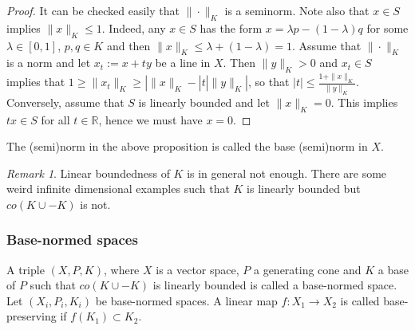 \documentclass[12pt]{article}
\theoremstyle{remark}
\newtheorem{rem}{Remark}
\newcommand{\<}{\langle}
\begin{document}
\begin{proof}
It can be checked easily that $\|\cdot\|_K$ is a seminorm. Note also that $x\in S$ implies $\|x\|_K\le 1$. Indeed, any $x\in S$ has the form $x=\lambda p-(1-\lambda)q$ for some  $\lambda\in [0,1]$, $p,q\in K$ and then  $\|x\|_K\le \lambda+(1-\lambda)=1$.  
Assume that $\|\cdot\|_K$ is a norm and let $x_t:=x+ty$ be a line in $X$. Then $\|y\|_K>0$ and $x_t\in  S$ implies that $1\ge \|x_t\|_K\ge |\|x\|_K-|t|\|y\|_K|$, so that $|t|\le \tfrac{1+\|x\|_K}{\|y\|_K}$. Conversely, assume that $S$ is linearly bounded and let $\|x\|_K=0$. This implies $tx\in S$ for all $t\in \mathbb R$, hence we must have 
$x=0$. 
 
%


\end{proof}

The (semi)norm in the above proposition  is called  the base (semi)norm in $X$. 

\begin{rem} Linear boundedness of $K$ is in general not enough. There are some weird infinite dimensional examples such that $K$ is linearly bounded but $co(K\cup -K)$ is not.

\end{rem}

\subsubsection*{Base-normed spaces}

A triple $(X,P,K)$, where $X$ is a vector space, $P$ a generating cone and $K$ a base of $P$ such that $co(K\cup-K)$ is linearly bounded is called a base-normed space. 
Let $(X_i,P_i,K_i)$ be base-normed spaces. A linear map $f:X_1\to X_2$ is called base-preserving if $f(K_1)\subset K_2$.
\end{document}
